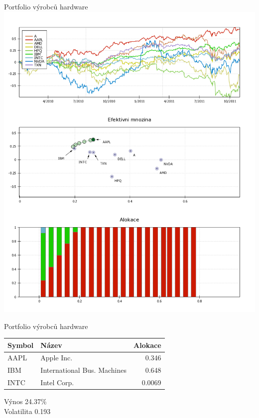\begin{frame}{Portfolio výrobců hardware}
        \includegraphics[height=0.9\textheight]{hw1.png}
\end{frame}

\begin{frame}{Portfolio výrobců hardware}
      \begin{tabular}{|l|l|r|}
        \hline
        Symbol&Název&Alokace\\\hline\hline
        AAPL&Apple Inc. &0.346\\\hline
        IBM&International Bus. Machines &0.648\\\hline
        INTC&Intel Corp. &0.0069\\\hline
      \end{tabular}
      
      Výnos 24.37\%\\
      Volatilita 0.193
\end{frame}

